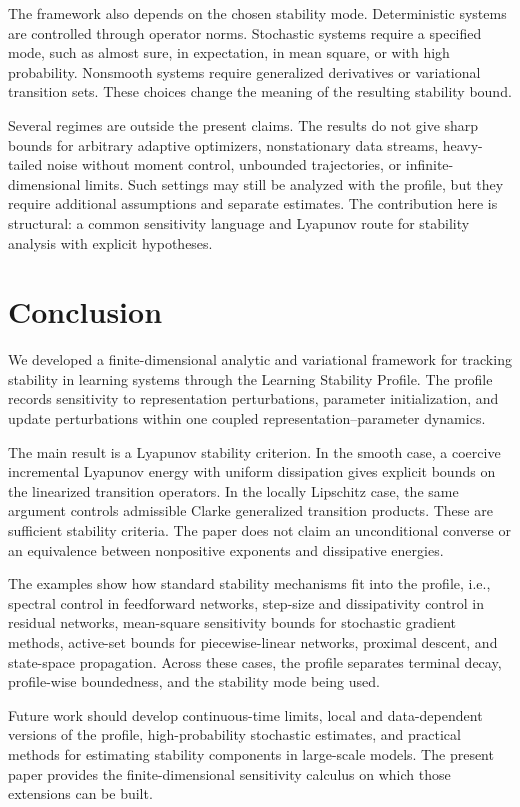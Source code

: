 \documentclass{article}
\numberwithin{equation}{section}
\begin{document}
The framework also depends on the chosen stability mode. Deterministic systems are controlled through operator norms. Stochastic systems require a specified mode, such as almost sure, in expectation, in mean square, or with high probability. Nonsmooth systems require generalized derivatives or variational transition sets. These choices change the meaning of the resulting stability bound.

Several regimes are outside the present claims. The results do not give sharp bounds for arbitrary adaptive optimizers, nonstationary data streams, heavy-tailed noise without moment control, unbounded trajectories, or infinite-dimensional limits. Such settings may still be analyzed with the profile, but they require additional assumptions and separate estimates. The contribution here is structural: a common sensitivity language and Lyapunov route for stability analysis with explicit hypotheses.

\section{Conclusion}
\label{sec:conclusion}

We developed a finite-dimensional analytic and variational framework for tracking stability in learning systems through the Learning Stability Profile. The profile records sensitivity to representation perturbations, parameter initialization, and update perturbations within one coupled representation--parameter dynamics.

The main result is a Lyapunov stability criterion. In the smooth case, a coercive incremental Lyapunov energy with uniform dissipation gives explicit bounds on the linearized transition operators. In the locally Lipschitz case, the same argument controls admissible Clarke generalized transition products. These are sufficient stability criteria. The paper does not claim an unconditional converse or an equivalence between nonpositive exponents and dissipative energies.

The examples show how standard stability mechanisms fit into the profile, i.e., spectral control in feedforward networks, step-size and dissipativity control in residual networks, mean-square sensitivity bounds for stochastic gradient methods, active-set bounds for piecewise-linear networks, proximal descent, and state-space propagation. Across these cases, the profile separates terminal decay, profile-wise boundedness, and the stability mode being used.

Future work should develop continuous-time limits, local and data-dependent versions of the profile, high-probability stochastic estimates, and practical methods for estimating stability components in large-scale models. The present paper provides the finite-dimensional sensitivity calculus on which those extensions can be built.



\end{document}

